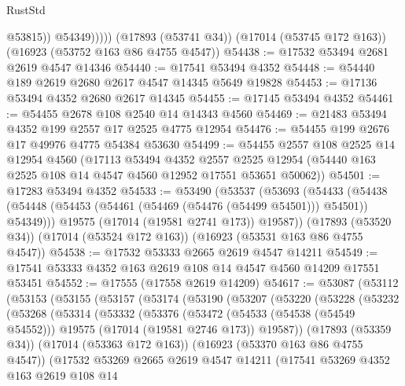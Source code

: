 \begin{lexlean}{RustStd}
\begin{coremodule}
                  @53815))
              @54349)))))
    (@17893 (@53741 @34))
    (@17014 (@53745 @172 @163))
    (@16923 (@53752 @163 @86 @4755 @4547))
@54438 := @17532 @53494 @2681 @2619 @4547 @14346
@54440 := @17541 @53494 @4352
@54448 := @54440 @189 @2619 @2680 @2617 @4547 @14345 @5649 @19828
@54453 := @17136 @53494 @4352 @2680 @2617 @14345
@54455 := @17145 @53494 @4352
@54461 := @54455 @2678 @108 @2540 @14 @14343 @4560
@54469 := @21483 @53494 @4352 @199 @2557 @17 @2525 @4775 @12954
@54476 := @54455 @199 @2676 @17 @49976 @4775 @54384 @53630
@54499 := @54455
    @2557
    @108
    @2525
    @14
    @12954
    @4560
    (@17113
      @53494
      @4352
      @2557
      @2525
      @12954
      (@54440 @163 @2525 @108 @14 @4547 @4560 @12952 @17551 @53651 @50062))
@54501 := @17283 @53494 @4352
@54533 := @53490
    (@53537
      (@53693
        (@54433 (@54438 (@54448 (@54453 (@54461 (@54469 (@54476 (@54499 @54501))) @54501)) @54349)))
        @19575
        (@17014 (@19581 @2741 @173))
        @19587))
    (@17893 (@53520 @34))
    (@17014 (@53524 @172 @163))
    (@16923 (@53531 @163 @86 @4755 @4547))
@54538 := @17532 @53333 @2665 @2619 @4547 @14211
@54549 := @17541 @53333 @4352 @163 @2619 @108 @14 @4547 @4560 @14209 @17551 @53451
@54552 := @17555 (@17558 @2619 @14209)
@54617 := @53087
    (@53112
      (@53153
        (@53155
          (@53157
            (@53174
              (@53190
                (@53207
                  (@53220
                    (@53228
                      (@53232
                        (@53268
                          (@53314
                            (@53332
                              (@53376
                                (@53472
                                  (@54533 (@54538 (@54549 @54552)))
                                  @19575
                                  (@17014 (@19581 @2746 @173))
                                  @19587))
                              (@17893 (@53359 @34))
                              (@17014 (@53363 @172 @163))
                              (@16923 (@53370 @163 @86 @4755 @4547))
                              (@17532
                                @53269
                                @2665
                                @2619
                                @4547
                                @14211
                                (@17541
                                  @53269
                                  @4352
                                  @163
                                  @2619
                                  @108
                                  @14

\end{coremodule}
\end{lexlean}
